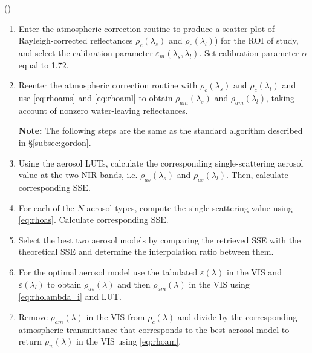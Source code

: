 (\citep{Ruddick:2000bs})
\begin{enumerate}[itemsep=2pt,parsep=2pt]
  \item Enter the atmospheric correction routine to produce a scatter plot of Rayleigh-corrected reflectances $\rho_c(\lambda_s)$ and $\rho_c(\lambda_l)$) for the ROI of study, and select the calibration parameter $\varepsilon_m(\lambda_s,\lambda_l)$. Set calibration parameter $\alpha$ equal to 1.72.

  \item Reenter the atmospheric correction routine with $\rho_c(\lambda_s)$ and $\rho_c(\lambda_l)$ and use \autoref{eq:rhoams} and \autoref{eq:rhoaml} to obtain $\rho_{am}(\lambda_s)$ and $\rho_{am}(\lambda_l)$, taking account of nonzero water-leaving reflectances.

  {\bf Note:} The following steps are the same as the standard algorithm described in \S\ref{subsec:gordon}.

  \item Using the aerosol LUTs, calculate the corresponding single-scattering aerosol value at the two NIR bands, i.e. $\rho_{as}(\lambda_s)$ and $\rho_{as}(\lambda_l)$. Then, calculate corresponding SSE.

  \item For each of the $N$ aerosol types, compute the single-scattering value using \autoref{eq:rhoas}. Calculate corresponding SSE.
  \item Select the best two aerosol models by comparing the retrieved SSE with the theoretical SSE and determine the interpolation ratio between them.
  \item For the optimal aerosol model use the tabulated $\varepsilon(\lambda)$ in the VIS and $\varepsilon(\lambda_l)$ to obtain $\rho_{as}(\lambda)$ and then $\rho_{am}(\lambda)$ in the VIS using \autoref{eq:rholambda_i} and LUT.
  \item Remove $\rho_{am}(\lambda)$ in the VIS from $\rho_c(\lambda)$ and divide by the corresponding atmospheric transmittance that corresponds to the best aerosol model to return $\rho_w(\lambda)$ in the VIS using \autoref{eq:rhoam}.
\end{enumerate}


